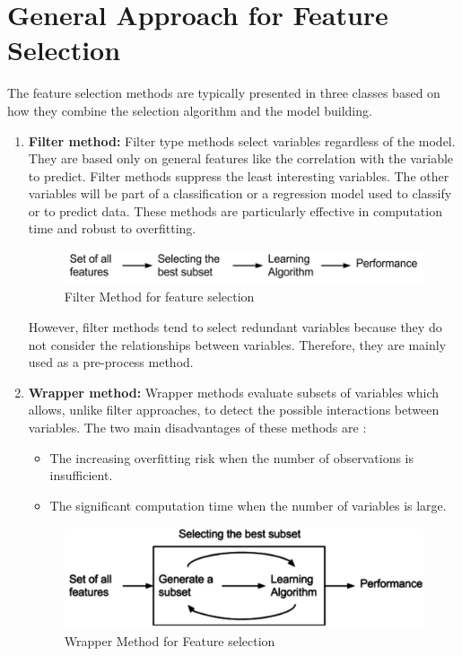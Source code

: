 \documentclass[document.tex]{subfiles}
\begin{document}
\section{General Approach for Feature Selection}
\noindent The feature selection methods are typically presented in three classes based on how they combine the selection algorithm and the model building.
\begin{enumerate}
	\item \textbf{Filter method: }Filter type methods select variables regardless of the model. They are based only on general features like the correlation with the variable to predict. Filter methods suppress the least interesting variables. The other variables will be part of a classification or a regression model used to classify or to predict data. These methods are particularly effective in computation time and robust to overfitting.
	\begin{figure}[H]
		\begin{center}
			\includegraphics[height=1.0cm]{imgs/filterMethod.png}
		\end{center}
		\caption{Filter Method for feature selection}
		\label{fig:Filter Method for feature selection}
	\end{figure}
	However, filter methods tend to select redundant variables because they do not consider the relationships between variables. Therefore, they are mainly used as a pre-process method.
	\item \textbf{Wrapper method:} Wrapper methods evaluate subsets of variables which allows, unlike filter approaches, to detect the possible interactions between variables. The two main disadvantages of these methods are :
	\begin{itemize}
		\item The increasing overfitting risk when the number of observations is insufficient.
		\item The significant computation time when the number of variables is large.
	\end{itemize}
	\begin{figure}[H]
		\begin{center}
			\includegraphics[height=3.0cm]{imgs/wrapperMethod.png}
		\end{center}
		\caption{Wrapper Method for Feature selection}
		\label{fig:Wrapper Method for Feature selection}
	\end{figure}


\end{enumerate}
\end{document}
